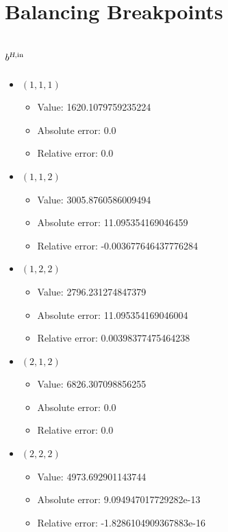 \documentclass{article}%
\begin{document}
\section{Balancing Breakpoints}%
\subsection{$b^{\textsl{H},\text{in}}$}%
\begin{itemize}%
	\item $(1, 1, 1)$%
	\begin{itemize}%
		\item Value: 1620.1079759235224%
		\item Absolute error: 0.0%
		\item Relative error: 0.0%
	\end{itemize}%
	\item $(1, 1, 2)$%
	\begin{itemize}%
		\item Value: 3005.8760586009494%
		\item Absolute error: 11.095354169046459%
		\item Relative error: -0.003677646437776284%
	\end{itemize}%
	\item $(1, 2, 2)$%
	\begin{itemize}%
		\item Value: 2796.231274847379%
		\item Absolute error: 11.095354169046004%
		\item Relative error: 0.00398377475464238%
	\end{itemize}%
	\item $(2, 1, 2)$%
	\begin{itemize}%
		\item Value: 6826.307098856255%
		\item Absolute error: 0.0%
		\item Relative error: 0.0%
	\end{itemize}%
	\item $(2, 2, 2)$%
	\begin{itemize}%
		\item Value: 4973.692901143744%
		\item Absolute error: 9.094947017729282e-13%
		\item Relative error: -1.8286104909367883e-16%
	\end{itemize}%
\end{itemize}%
\end{document}
